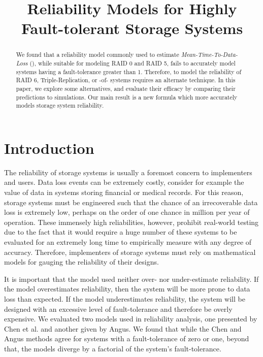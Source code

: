 \documentclass[XXX,endnotes]{usetex-v1}
\begin{document}
\title{Reliability Models for Highly Fault-tolerant Storage Systems}


\author{
\and
{}
} 
\maketitle

\begin{abstract}

We found that a reliability model commonly used to estimate \emph{Mean-Time-To-Data-Loss} (), while suitable for modeling RAID 0 and RAID 5, fails to accurately model systems having a fault-tolerance greater than 1.  Therefore, to model the reliability of RAID 6, Triple-Replication, or -of- systems requires an alternate technique.  In this paper, we explore some alternatives, and evaluate their efficacy by comparing their predictions to simulations.  Our main result is a new formula which more accurately models storage system reliability.

\end{abstract}

\section{Introduction}

The reliability of storage systems is usually a foremost concern to implementers and users.  Data loss events can be extremely costly, consider for example the value of data in systems storing financial or medical records.  For this reason, storage systems must be engineered such that the chance of an irrecoverable data loss is extremely low, perhaps on the order of one chance in million per year of operation.  These immensely high reliabilities, however, prohibit real-world testing due to the fact that it would require a huge number of these systems to be evaluated for an extremely long time to empirically measure with any degree of accuracy.  Therefore, implementers of storage systems must rely on mathematical models for gauging the reliability of their designs.

It is important that the model used neither over- nor under-estimate reliability.  If the model overestimates reliability, then the system will be more prone to data loss than expected.  If the model underestimates reliability, the system will be designed with an excessive level of fault-tolerance and therefore be overly expensive.  We evaluated two models used in reliability analysis, one presented by Chen et al.\cite{reliability} and another given by Angus\cite{markov}. We found that while the Chen and Angus methods agree for systems with a fault-tolerance of zero or one, beyond that, the models diverge by a factorial of the system's fault-tolerance.
\end{document}
